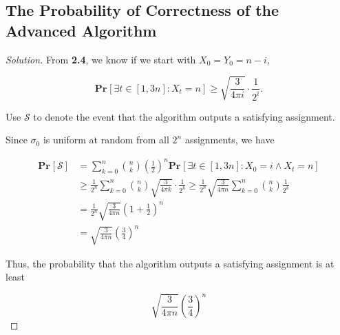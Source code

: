 \documentclass{article}
\renewcommand{\Pr}[2]{\mathbf{Pr}_{#1}\left[#2\right]}
\newenvironment{solution}{\begin{proof}[\noindent\it Solution]}{\end{proof}}
\begin{document}
\vspace{3em}
\subsection{The Probability of Correctness of the Advanced Algorithm}
\vspace{1em}
\begin{solution}
    From \textbf{2.4}, we know if we start with $X_0=Y_0=n-i,$
    
    \vspace{-1em}
    $$\Pr{}{\exists t\in[1,3n]: X_t=n}\geq\sqrt{\frac{3}{4\pi i}}\cdot\frac{1}{2^i}.$$
    
    \vspace{-0.3em} \hspace{2.6em}
    Use $\mathscr{S}$ to denote the event that the algorithm outputs a satisfying assignment.
    
    \hspace{2.6em}
    Since $\sigma_0$ is uniform at random from all $2^n$ assignments, we have
    
    \vspace{-2.2em}
    \begin{align*}
        \Pr{}{\mathscr{S}} & = \sum_{k=0}^{n} \binom{n}{k}\left(\frac{1}{2}\right)^{n}\Pr{}{\exists t\in[1,3n]: X_0=i \land X_t=n}\\
        & \geq \frac{1}{2^n}\sum_{k=0}^{n} \binom{n}{k}\sqrt{\frac{3}{4\pi k}}\cdot\frac{1}{2^k} \geq \frac{1}{2^n}\sqrt{\frac{3}{4\pi n}}\sum_{k=0}^{n} \binom{n}{k}\frac{1}{2^k} \\
        & = \frac{1}{2^n}\sqrt{\frac{3}{4\pi n}}\left(1+\frac{1}{2}\right)^{n} \\
        & = \sqrt{\frac{3}{4\pi n}}\left(\frac{3}{4}\right)^{n}
    \end{align*}
    
    \vspace{0.3em}\hspace{2.6em}
    Thus, the probability that the algorithm outputs a satisfying assignment is at least
    
    \vspace{-0.3em}
    $$\sqrt{\frac{3}{4\pi n}}\left(\frac{3}{4}\right)^{n}$$
    
    \vspace{-2.5em}
\end{solution}


\newpage
\end{document}
